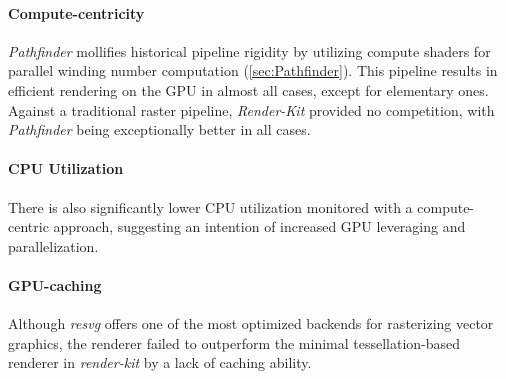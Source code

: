 \paragraph{Compute-centricity} \textit{Pathfinder} mollifies historical pipeline rigidity by utilizing compute shaders for parallel winding number computation (\cref{sec:Pathfinder}). This pipeline results in efficient rendering on the GPU in almost all cases, except for elementary ones. Against a traditional raster pipeline, \textit{Render-Kit} provided no competition, with \textit{Pathfinder} being exceptionally better in all cases.\medskip

\paragraph{CPU Utilization} There is also significantly lower CPU utilization monitored with a compute-centric approach, suggesting an intention of increased GPU leveraging and parallelization.

\paragraph{GPU-caching} Although \textit{resvg} offers one of the most optimized backends for rasterizing vector graphics, the renderer failed to outperform the minimal tessellation-based renderer in \textit{render-kit} by a lack of caching ability.
